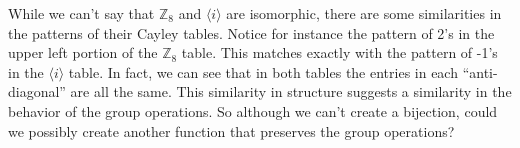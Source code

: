 While we can't say that ${\mathbb Z_8}$ and $\langle i \rangle$ are isomorphic, there  are some similarities in the patterns of their Cayley tables.  
Notice for instance the pattern of 2's in the upper left portion of the ${\mathbb Z_8}$ table. This matches exactly with the pattern of -1's in the $\langle i \rangle$ table. In fact, we can see that in both tables the entries in each ``anti-diagonal'' are all the same. 
This similarity in structure suggests a similarity in the behavior of the group operations.  
So although we can't create a bijection, could we possibly create another function that preserves the group operations?   


